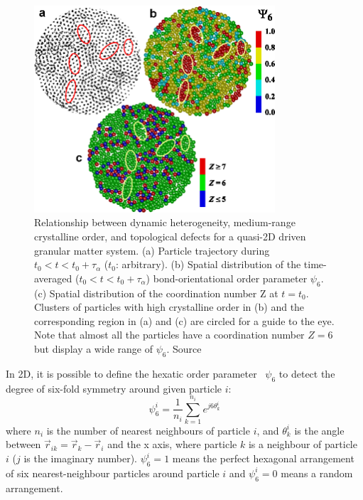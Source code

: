 \begin{figure}
	\centering
	\includegraphics[width=0.8\textwidth]{coordination}
	\caption{Relationship between dynamic heterogeneity, medium-range crystalline order, and topological defects for a quasi-2D driven granular matter system. (a) Particle trajectory during $t_0 < t < t_0 +\tau_\alpha$ ($t_0$: arbitrary). (b) Spatial distribution of the time-averaged ($t_0 < t < t_0 +\tau_\alpha$) bond-orientational order parameter $\psi_6$. (c) Spatial distribution of the coordination number Z at $t = t_0$. Clusters of particles with high crystalline order in (b) and the corresponding region in (a) and (c) are circled for a guide to the eye. Note that almost all the particles have a coordination number $Z=6$ but display a wide range of $\psi_6$. Source }
	\label{fig:coordination}
\end{figure}

In 2D, it is possible to define the hexatic order parameter~\citep{Nelson1979, Binder2002, Hamanaka2006, kawasaki2007cbd} $\psi_6$ to detect the degree of six-fold symmetry around given particle $i$:
\begin{equation} 
	\psi_{6}^{i}=\frac{1}{n_i}\sum^{n_i}_{k=1}e^{j6\theta^i_{k}} 
\end{equation}
where $n_i$ is the number of nearest neighbours of particle $i$, and $\theta^i_k$ is the angle between $\vec{r}_{ik} = \vec{r}_k - \vec{r}_i$ and the x axis, where particle $k$ is a neighbour of particle $i$ ($j$ is the imaginary number). $\psi_{6}^{i}=1$ means the perfect hexagonal arrangement of six nearest-neighbour particles around particle $i$ and $\psi_{6}^{i}=0$ means a random arrangement.

